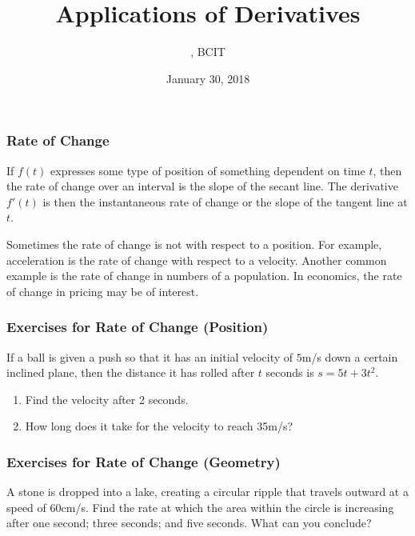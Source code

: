 \documentclass[xcolor=dvipsnames]{beamer}
\title{Applications of Derivatives}
\subtitle{{\CourseNumber}, BCIT}
\author{\CourseName}
\date{January 30, 2018}
\begin{document}
\begin{frame}
  \titlepage
\end{frame}

\begin{frame}
  \frametitle{Rate of Change}
If $f(t)$ expresses some type of position of something dependent on
time $t$, then the rate of change over an interval is the slope of the
secant line. The derivative $f'(t)$ is then the instantaneous rate of
change or the slope of the tangent line at $t$. 

\bigskip

Sometimes the rate of change is not with respect to a position. For
example, acceleration is the rate of change with respect to a
velocity. Another common example is the rate of change in numbers of a
population. In economics, the rate of change in pricing may be of
interest.
\end{frame}

\begin{frame}
  \frametitle{Exercises for Rate of Change (Position)}
If a ball is given a push so that it has an initial velocity of $5$m/s
down a certain inclined plane, then the distance it has rolled after
$t$ seconds is $s=5t+3t^{2}$.
  \begin{enumerate}
  \item<1-> Find the velocity after 2 seconds.
  \item<2-> How long does it take for the velocity to reach 35m/s?
  \end{enumerate}
\end{frame}

\begin{frame}
  \frametitle{Exercises for Rate of Change (Geometry)}
A stone is dropped into a lake, creating a circular ripple that
travels outward at a speed of 60cm/s. Find the rate at which the area
within the circle is increasing after one second; three seconds; and
five seconds. What can you conclude?
\end{frame}
\end{document}
